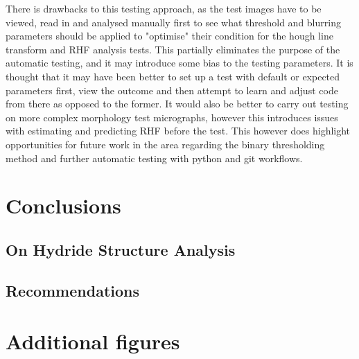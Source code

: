 \documentclass{article}
\begin{document}
    There is drawbacks to this testing approach, as the test images have to be viewed, read in and analysed manually first to see what threshold and blurring parameters should be applied to "optimise" their condition for the hough line transform and RHF analysis tests. This partially eliminates the purpose of the automatic testing, and it may introduce some bias to the testing parameters. It is thought that it may have been better to set up a test with default or expected parameters first, view the outcome and then attempt to learn and adjust code from there as opposed to the former. It would also be better to carry out testing on more complex morphology test micrographs, however this introduces issues with estimating and predicting RHF before the test. This however does highlight opportunities for future work in the area regarding the binary thresholding method and further automatic testing with python and git workflows.

\section{Conclusions}
\subsection{On Hydride Structure Analysis}

\subsection{Recommendations}

\newpage



\newpage
\appendix
\section{Additional figures}
\end{document}
